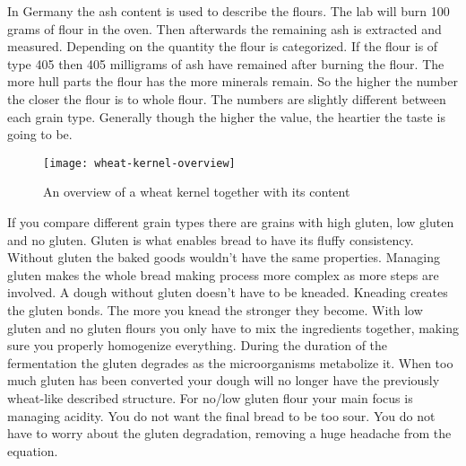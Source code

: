 In Germany the ash content is used to describe the flours. The lab will burn
100 grams of flour in the oven. Then afterwards the remaining ash is extracted
and measured. Depending on the quantity the flour is categorized. If the flour
is of type 405 then 405 milligrams of ash have remained after burning the
flour. The more hull parts the flour has the more minerals remain. So the
higher the number the closer the flour is to whole flour. The numbers are
slightly different between each grain type. Generally though the higher the
value, the heartier the taste is going to be.

\begin{figure}[htb!]
  \texttt{[image: wheat-kernel-overview]}
  \caption{An overview of a wheat kernel together with its content}
  \label{fig:wheat-kernel-overview}
\end{figure}

If you compare different grain types there are grains with high gluten, low gluten
and no gluten. Gluten is what enables bread to have its fluffy consistency.
Without gluten the baked goods wouldn't have the same properties. Managing
gluten makes the whole bread making process more complex as more steps are involved.
A dough without gluten doesn't have to be kneaded. Kneading creates
the gluten bonds. The more you knead the stronger they become. With low
gluten and no gluten flours you only have to mix the ingredients together, making
sure you properly homogenize everything. During the duration of the fermentation
the gluten degrades as the microorganisms metabolize it. When too much gluten
has been converted your dough will no longer have the previously wheat-like described
structure. For no/low gluten flour your main focus is managing acidity. You do not
want the final bread to be too sour. You do not have to worry about the gluten
degradation, removing a huge headache from the equation.

